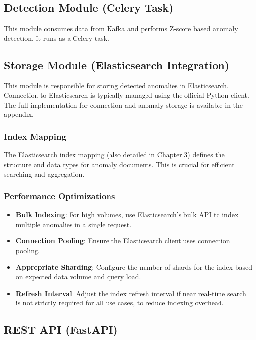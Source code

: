 \subsection{Detection Module (Celery Task)}

This module consumes data from Kafka and performs Z-score based anomaly detection. It runs as a Celery task.



\subsection{Storage Module (Elasticsearch Integration)}

This module is responsible for storing detected anomalies in Elasticsearch. Connection to Elasticsearch is typically managed using the official Python client. The full implementation for connection and anomaly storage is available in the appendix.

\subsubsection{Index Mapping}
The Elasticsearch index mapping (also detailed in Chapter 3) defines the structure and data types for anomaly documents. This is crucial for efficient searching and aggregation.

\subsubsection{Performance Optimizations}
\begin{itemize}
    \item \textbf{Bulk Indexing}: For high volumes, use Elasticsearch's bulk API to index multiple anomalies in a single request.
    \item \textbf{Connection Pooling}: Ensure the Elasticsearch client uses connection pooling.
    \item \textbf{Appropriate Sharding}: Configure the number of shards for the index based on expected data volume and query load.
    \item \textbf{Refresh Interval}: Adjust the index refresh interval if near real-time search is not strictly required for all use cases, to reduce indexing overhead.
\end{itemize}
 

\subsection{REST API (FastAPI)}

